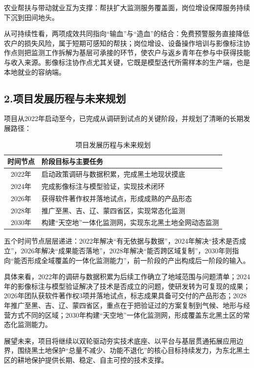 \documentclass[12pt, a4paper]{ctexart}
\begin{document}
农业帮扶与带动就业互为支撑：帮扶扩大监测服务覆盖面，岗位增设保障服务持续下沉到田间地头。

从可持续性看，两项成效共同指向“输血”与“造血”的结合：免费预警服务直接降低农户的损失风险，属于短期可感知的帮扶；岗位增设、设备操作培训与影像标注协作点则把监测工作拆解为基层可承接的环节，使农户与返乡青年在参与中获得技能与收入来源。影像标注协作点尤其关键，它既是模型迭代所需样本的生产端，也是本地就业的容纳端。

\subsection{2.项目发展历程与未来规划}

项目从2022年启动至今，已完成从调研到试点的关键阶段，并规划了清晰的长期发展路径：

\begin{table}[htbp]
  \centering
  \caption{项目发展历程与未来规划}
  \begin{tabular}{|c|p{}|}
  \hline
  时间节点 & 阶段目标与主要任务 \\
  \hline
  2022年 & 启动政策调研与数据积累，完成黑土地现状摸底 \\
  \hline
  2024年 & 完成影像标注与模型验证，实现技术闭环 \\
  \hline
  2026年 & 获得软件著作权并落地试点，形成成熟的产品形态 \\
  \hline
  2028年 & 推广至黑、吉、辽、蒙四省区，实现常态化监测 \\
  \hline
  2030年 & 构建“天空地”一体化监测网，实现东北黑土地全网动态监测 \\
  \hline
  \end{tabular}
  \label{tab:plan}
\end{table}

五个时间节点层层递进：2022年解决“有无依据与数据”，2024年解决“技术是否成立”，2026年解决“成果能否落地”，2028年解决“能否跨区域复制”，2030年则指向“能否形成全域覆盖的一体化监测能力”，前一阶段的产出构成后一阶段的输入。

具体来看，2022年的调研与数据积累为后续工作确立了地域范围与问题清单；2024年的影像标注与模型验证解决了技术是否成立的问题，使研发转为可复现的成果；2026年团队获软件著作权3项并落地试点，标志成果具备可交付的产品形态；2028年推广至黑、吉、辽、蒙四省区，重点在于把验证过的方案复制到气候、地形与经营方式不同的区域；2030年构建“天空地”一体化监测网，形成覆盖东北黑土区的常态化监测能力。

展望未来，项目将继续以双轮驱动夯实技术底座、以平台与基层贯通拓展应用边界，围绕黑土地保护“总量不减少、功能不退化”的核心目标持续发力，为东北黑土区的耕地保护提供长期、稳定、自主可控的技术支撑。
\end{document}

